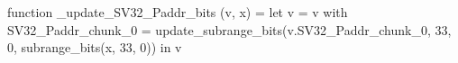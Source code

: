 function _update_SV32_Paddr_bits (v, x) = let v = { v with SV32_Paddr_chunk_0 = update_subrange_bits(v.SV32_Paddr_chunk_0, 33, 0, subrange_bits(x, 33, 0)) } in
  v

